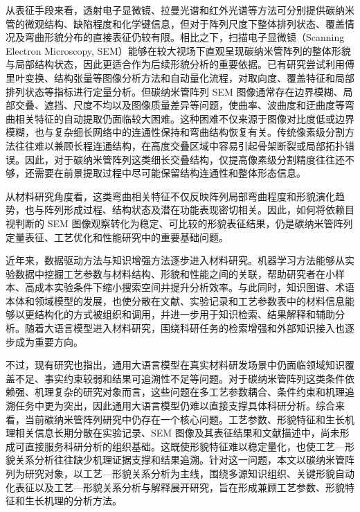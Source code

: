 从表征手段来看，透射电子显微镜、拉曼光谱和红外光谱等方法可分别提供碳纳米管的微观结构、缺陷程度和化学键信息\cite{Liu2021EcoMat,Zhang2017DoubleLayer}，但对于阵列尺度下整体排列状态、覆盖情况及弯曲形貌分布的直接表征仍较有限。相比之下，扫描电子显微镜（Scanning Electron Microscopy, SEM）能够在较大视场下直观呈现碳纳米管阵列的整体形貌与局部结构状态，因此更适合作为后续形貌分析的重要依据\cite{Imtiaz2023,Yadav2024}。已有研究尝试利用傅里叶变换、结构张量等图像分析方法和自动量化流程，对取向度、覆盖特征和局部排列状态等指标进行定量分析\cite{Imtiaz2023,Yadav2024}。但碳纳米管阵列 SEM 图像通常存在边界模糊、局部交叠、遮挡、尺度不均以及图像质量差异等问题，使曲率、波曲度和迂曲度等弯曲相关特征的自动提取仍面临较大困难\cite{Jackman2013}。这种困难不仅来源于图像对比度低或边界模糊，也与复杂细长网络中的连通性保持和弯曲结构恢复有关。传统像素级分割方法往往难以兼顾长程连通结构，在高度交叠区域中容易引起骨架断裂或局部拓扑错误\cite{Shit2021clDice}。因此，对于碳纳米管阵列这类细长交叠结构，仅提高像素级分割精度往往还不够，还需要在前景提取过程中尽可能保留结构连通性和整体形态信息。

从材料研究角度看，这类弯曲相关特征不仅反映阵列局部弯曲程度和形貌演化趋势，也与阵列形成过程、结构状态及潜在功能表现密切相关\cite{Wang2019DynamicCurvature,Ginga2013Waviness,Hajilounezhad2021}。因此，如何将依赖目视判断的 SEM 图像观察转化为稳定、可比较的形貌表征结果，仍是碳纳米管阵列定量表征、工艺优化和性能研究中的重要基础问题。

近年来，数据驱动方法与知识增强方法逐步进入材料研究。机器学习方法能够从实验数据中挖掘工艺参数与材料结构、形貌和性能之间的关联，帮助研究者在小样本、高成本实验条件下缩小搜索空间并提升分析效率\cite{Lookman2019}。与此同时，知识图谱、术语本体和领域模型的发展\cite{Statt2023,Venugopal2024,MDSOnto2025}，也使分散在文献、实验记录和工艺参数表中的材料信息能够以更结构化的方式被组织和调用，并进一步用于知识检索、结果解释和辅助分析\cite{Wang2025KnowledgeGuidedLLM}。随着大语言模型进入材料研究\cite{Choi2024,Jiang2025}，围绕科研任务的检索增强和外部知识接入也逐步成为重要方向。

不过，现有研究也指出，通用大语言模型在真实材料研发场景中仍面临领域知识覆盖不足、事实约束较弱和结果可追溯性不足等问题\cite{Miret2025,PyzerKnapp2025FoundationModels,Zhang2025RAGHallucination}。对于碳纳米管阵列这类条件依赖强、机理复杂的研究对象\cite{Bulyarskiy2020,Liu2021EcoMat}而言，这些问题在多工艺参数耦合、条件约束和机理追溯任务中更为突出，因此通用大语言模型仍难以直接支撑具体科研分析。综合来看，当前碳纳米管阵列研究中仍存在一个核心问题。工艺参数、形貌特征和生长机理相关信息长期分散在实验记录、SEM 图像及其表征结果和文献描述中，尚未形成可直接服务科研分析的组织基础。这既使形貌特征难以稳定量化，也使工艺—形貌关系分析往往缺少机理证据支撑和结果追溯。针对这一问题，本文以碳纳米管阵列为研究对象，以工艺—形貌关系分析为主线，围绕多源知识组织、关键形貌自动化表征以及工艺—形貌关系分析与解释展开研究，旨在形成兼顾工艺参数、形貌特征和生长机理的分析方法。

